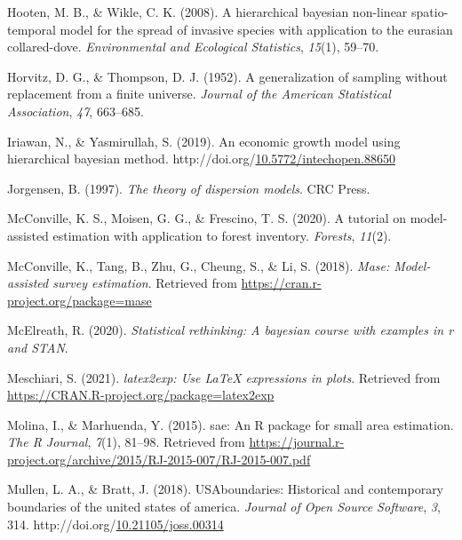 \documentclass[12pt,twoside]{reedthesis}
\newlength{\cslhangindent}
\newenvironment{CSLReferences}[2] %
 {%
  \setlength{\parindent}{0pt}
  \ifodd #1 \everypar{\setlength{\hangindent}{\cslhangindent}}\ignorespaces\fi
  \ifnum #2 > 0
  \setlength{\parskip}{#2\baselineskip}
  \fi
 }%
 {}
\begin{document}
\begin{CSLReferences}{1}{0}
\leavevmode{}%
Hooten, M. B., \& Wikle, C. K. (2008). A hierarchical bayesian non-linear spatio-temporal model for the spread of invasive species with application to the eurasian collared-dove. \emph{Environmental and Ecological Statistics}, \emph{15}(1), 59--70.

\leavevmode{}%
Horvitz, D. G., \& Thompson, D. J. (1952). A generalization of sampling without replacement from a finite universe. \emph{Journal of the American Statistical Association}, \emph{47}, 663--685.

\leavevmode{}%
Iriawan, N., \& Yasmirullah, S. (2019). An economic growth model using hierarchical bayesian method. http://doi.org/\href{https://doi.org/10.5772/intechopen.88650}{10.5772/intechopen.88650}

\leavevmode{}%
Jorgensen, B. (1997). \emph{The theory of dispersion models}. CRC Press.

\leavevmode{}%
McConville, K. S., Moisen, G. G., \& Frescino, T. S. (2020). A tutorial on model-assisted estimation with application to forest inventory. \emph{Forests}, \emph{11}(2).

\leavevmode{}%
McConville, K., Tang, B., Zhu, G., Cheung, S., \& Li, S. (2018). \emph{Mase: Model-assisted survey estimation}. Retrieved from \url{https://cran.r-project.org/package=mase}

\leavevmode{}%
McElreath, R. (2020). \emph{Statistical rethinking: A bayesian course with examples in r and STAN}.

\leavevmode{}%
Meschiari, S. (2021). \emph{latex2exp: Use LaTeX expressions in plots}. Retrieved from \url{https://CRAN.R-project.org/package=latex2exp}

\leavevmode{}%
Molina, I., \& Marhuenda, Y. (2015). {sae}: An {R} package for small area estimation. \emph{The R Journal}, \emph{7}(1), 81--98. Retrieved from \url{https://journal.r-project.org/archive/2015/RJ-2015-007/RJ-2015-007.pdf}

\leavevmode{}%
Mullen, L. A., \& Bratt, J. (2018). {USAboundaries}: Historical and contemporary boundaries of the united states of america. \emph{Journal of Open Source Software}, \emph{3}, 314. http://doi.org/\href{https://doi.org/10.21105/joss.00314}{10.21105/joss.00314}


\end{CSLReferences}
\end{document}
